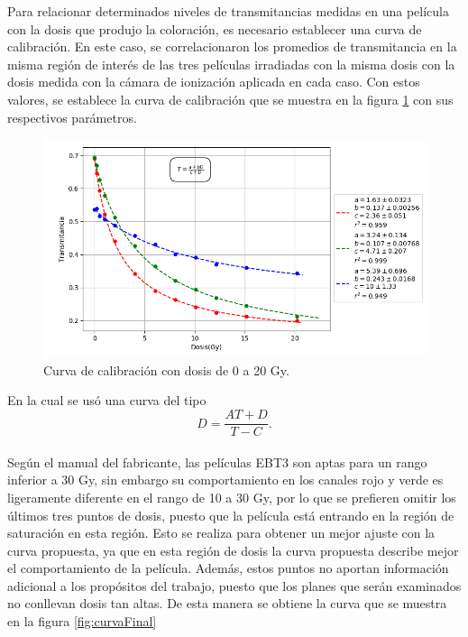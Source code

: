 Para relacionar determinados niveles de transmitancias medidas en una película con la dosis que produjo la coloración, es necesario establecer una curva de calibración. En este caso, se correlacionaron los promedios de transmitancia en la misma región de interés de las tres películas irradiadas con la misma dosis con la dosis medida con la cámara de ionización aplicada en cada caso. Con estos valores, se establece la curva de calibración que se muestra en la figura \ref{fig:curvaFinal20} con sus respectivos parámetros.\\


\begin{figure}[H]
	\centering
\includegraphics[width=\linewidth]{images/calibracionMulti0a20_2.png}
	
	\caption{Curva de calibración con dosis de 0 a 20 Gy. }
	\label{fig:curvaFinal20}
\end{figure}

En la cual se usó una curva del tipo 
\begin{equation}
D=\frac{AT+D}{T-C}.
\end{equation}\\

Según el manual del fabricante, las películas EBT3 son aptas para un rango inferior a 30 Gy, sin embargo su comportamiento en los canales rojo y verde es ligeramente diferente en el rango de 10 a 30 Gy, por lo que se prefieren omitir los últimos tres puntos de dosis, puesto que la película está entrando en la región de saturación en esta región. Esto se realiza para obtener un mejor ajuste con la curva propuesta, ya que en esta región de dosis la curva propuesta describe mejor el comportamiento de la película.  Además, estos puntos no aportan información adicional a los propósitos del trabajo, puesto que los planes que serán examinados no conllevan dosis tan altas. De esta manera se obtiene la curva que se muestra en la figura \ref{fig:curvaFinal}\\


